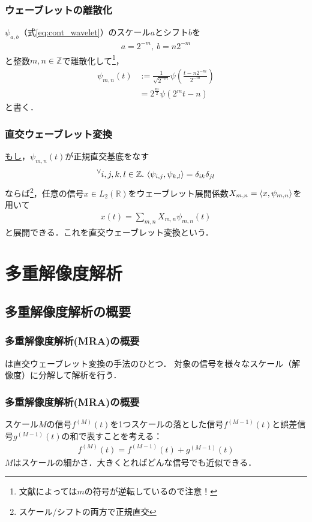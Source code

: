 \documentclass[dvipdfmx,graphicx,14pt]{beamer}
\begin{document}
\begin{frame}[c]
    \frametitle{ウェーブレットの離散化}
    $\psi_{a,b}$（式\eqref{eq:cont_wavelet}）のスケール$a$とシフト$b$を
    \begin{align*}
        a = 2^{-m},\ b = n2^{-m}
    \end{align*}
    と整数$m,n\in \mathbb{Z}$で離散化して\footnote{文献によっては$m$の符号が逆転しているので注意！}，
    \begin{align}
        \psi_{m,n}(t) &:= \frac{1}{\sqrt{2^{-m}}} \psi\left( \frac{t - n2^{-m}}{2^{-m}} \right) \nonumber \\
        &= 2^{\frac{m}{2}} \psi(2^{m}t - n)
    \end{align}
    と書く．
\end{frame}

\begin{frame}[c]
    \frametitle{直交ウェーブレット変換}
    \underline{もし}，$\psi_{m,n}(t)$が正規直交基底をなす
    \begin{align*}
        {}^{\forall} i,j,k,l \in \mathbb{Z}.\ \innprod{\psi_{i,j}}{\psi_{k,l}} = \delta_{ik} \delta_{jl}
    \end{align*}
    ならば\footnote{スケール/シフトの両方で正規直交}，任意の信号$x \in L_{2}(\mathbb{R})$をウェーブレット展開係数$X_{m,n} = \langle x, \psi_{m,n} \rangle$を用いて
    \begin{align}
        x(t) = \sum_{m,n} X_{m,n} \psi_{m,n}(t)
    \end{align}
    と展開できる．これを直交ウェーブレット変換という．
\end{frame}

\section{多重解像度解析}

\subsection{多重解像度解析の概要}

\begin{frame}[c]
    \frametitle{多重解像度解析(MRA)の概要}
    は直交ウェーブレット変換の手法のひとつ．
    対象の信号を様々なスケール（解像度）に分解して解析を行う．
\end{frame}

\begin{frame}[c]
    \frametitle{多重解像度解析(MRA)の概要}
    スケール$M$の信号$f^{(M)}(t)$を1つスケールの落とした信号$f^{(M-1)}(t)$と誤差信号$g^{(M-1)}(t)$の和で表すことを考える：
    \begin{align}
        f^{(M)}(t) = f^{(M-1)}(t) + g^{(M-1)}(t) \label{eq:mra_decomp_onescale}
    \end{align}
    $M$はスケールの細かさ．大きくとればどんな信号でも近似できる．
\end{frame}
\end{document}
